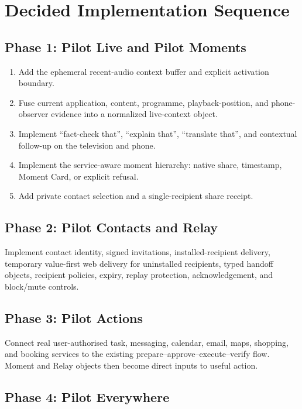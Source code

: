 \documentclass[11pt,a4paper]{article}
\begin{document}
\section{Decided Implementation Sequence}

\subsection*{Phase 1: Pilot Live and Pilot Moments}

\begin{enumerate}[leftmargin=*]
  \item Add the ephemeral recent-audio context buffer and explicit activation
        boundary.
  \item Fuse current application, content, programme, playback-position, and
        phone-observer evidence into a normalized live-context object.
  \item Implement ``fact-check that'', ``explain that'', ``translate that'',
        and contextual follow-up on the television and phone.
  \item Implement the service-aware moment hierarchy: native share, timestamp,
        Moment Card, or explicit refusal.
  \item Add private contact selection and a single-recipient share receipt.
\end{enumerate}

\subsection*{Phase 2: Pilot Contacts and Relay}

Implement contact identity, signed invitations, installed-recipient delivery,
temporary value-first web delivery for uninstalled recipients, typed handoff
objects, recipient policies, expiry, replay protection, acknowledgement, and
block/mute controls.

\subsection*{Phase 3: Pilot Actions}

Connect real user-authorised task, messaging, calendar, email, maps, shopping,
and booking services to the existing prepare--approve--execute--verify flow.
Moment and Relay objects then become direct inputs to useful action.

\subsection*{Phase 4: Pilot Everywhere}
\end{document}
